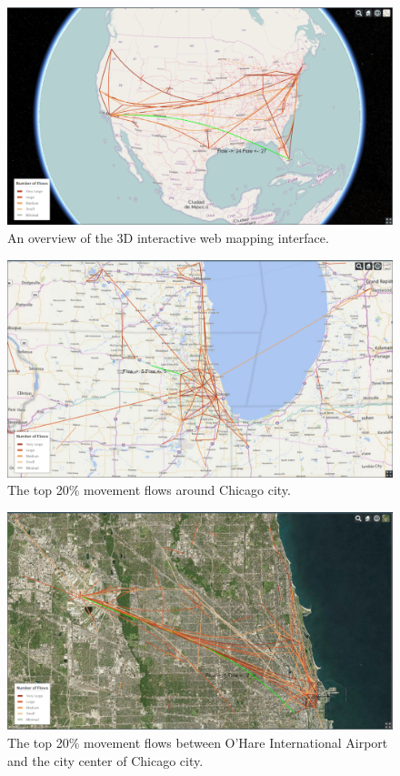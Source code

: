 \documentclass[ijgi,article,accept,moreauthors,pdftex,10pt,a4paper]{mdpi}
\theoremstyle{mdpi}
\newcounter{re}
\theoremstyle{mdpidefinition}
\begin{document}
\begin{figure}[ht]
\centering
\includegraphics[width=0.8\linewidth]{./figures/all}
\caption{An overview of the 3D interactive web mapping interface.}
\label{fig:Web_Interface}
\end{figure}
\FloatBarrier

\begin{figure}[ht]
\centering
\includegraphics[width=0.8\linewidth]{./figures/Chicago}
\caption{The top 20$\%$ movement flows around Chicago city.}
\label{fig:chicago}
\end{figure}
\FloatBarrier

\begin{figure}[ht]
\centering
\includegraphics[width=0.8\linewidth]{./figures/Chicago_airport}
\caption{The top 20$\%$ movement flows between O'Hare International Airport and the city center of Chicago city.}
\label{fig:Chicago_airport}
\end{figure}
\FloatBarrier
\end{document}
